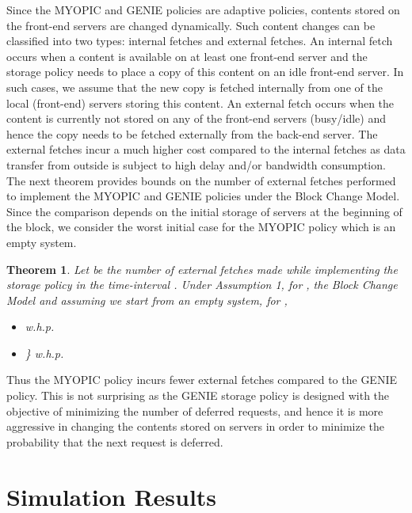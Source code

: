 \documentclass[10pt, conference, letterpaper]{IEEEtran}
\newtheorem{theorem}{Theorem}
\begin{document}
Since the MYOPIC and GENIE policies are adaptive policies, contents stored on the front-end servers are changed dynamically. Such content changes can be classified into two types: internal fetches and external fetches. An internal fetch occurs when a content is available on at least one front-end server and the storage policy needs to place a copy of this content on an idle front-end server. In such cases, we assume that the new copy is fetched internally from one of the local (front-end) servers storing this content. An external fetch occurs when the content is currently not stored on any of the front-end servers (busy/idle) and hence the copy needs to be fetched externally from the back-end server. The external fetches incur a much higher cost compared to the internal fetches as data transfer from outside is subject to high delay and/or bandwidth consumption. The next theorem provides bounds on the number of external fetches performed to implement the MYOPIC and GENIE policies under the Block Change Model. Since the comparison depends on the initial storage of servers at the beginning of the block, we consider the worst initial case for the MYOPIC policy which is an empty system.
\begin{theorem}
	\label{thm:adaptation_cost}
	Let   be the number of external fetches made while implementing the storage policy  in the time-interval . Under Assumption 1, for , the Block Change Model and assuming we start from an empty system, for ,
	\begin{itemize}
		\item [(i)]  w.h.p.
		\item [(ii)] \} w.h.p.
	\end{itemize}
\end{theorem}

Thus the MYOPIC policy incurs fewer external fetches compared to the GENIE policy. This is not surprising as the GENIE storage policy is designed with the objective of minimizing the number of deferred requests, and hence it is more aggressive in changing the contents stored on servers in order to minimize the probability that the next request is deferred.

\section{Simulation Results}
\label{sec:simulation_results}
\end{document}
